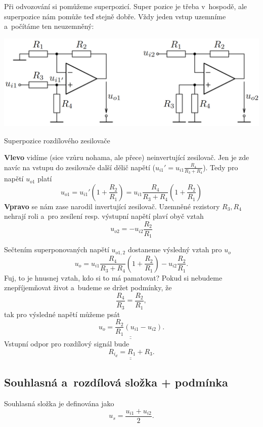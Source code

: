 \documentclass[a4paper,12pt]{article}   %
\begin{document}
Při odvozování si pomůžeme superpozicí. Super pozice je třeba v~hospodě, ale superpozice nám pomůže teď stejně dobře. Vždy jeden vstup uzemníme a~počítáme ten neuzemněný:
\begin{schema}[h!]
    \centering
    \includegraphics[height=.25\linewidth]{rozdilovy-zesilovac-oz-superpozice.PNG}
    \caption{Superpozice rozdílového zesilovače}
\end{schema}
\textbf{Vlevo} vidíme (sice vzůru nohama, ale přece) neinvertující zesilovač. Jen je zde navíc na vstupu do zesilovače další dělič napětí ($u_{i1}' = u_{i1}\frac{R_4}{R_3 + R_4}$). Tedy pro napětí $u_{o1}$ platí 
\begin{equation*}
    u_{o1} = u_{i1}'\left(1+\frac{R_2}{R_1}\right) = u_{i1}\frac{R_4}{R_3+R_4}\left(1+\frac{R_2}{R_1}\right)
\end{equation*}
\textbf{Vpravo} se nám zase narodil invertující zesilovač. Uzemněné rezistory $R_3, R_4$ nehrají roli a~pro zesílení resp. výstupní napětí plaví obyč vztah
\begin{equation*}
    u_{o2} = -u_{i2}\frac{R_2}{R_1}
\end{equation*}

Sečtením superponovaných napětí $u_{o1,2}$ dostaneme výsledný vztah pro $u_o$
\begin{equation}
    u_o = u_{i1}\frac{R_4}{R_3+R_4}\left(1+\frac{R_2}{R_1}\right)-u_{i2}\frac{R_2}{R_1}.
\end{equation}
Fuj, to je hnusnej vztah, kdo si to má pamatovat? Pokud si nebudeme znepříjemňovat život a~budeme se držet podmínky, že
\begin{equation*}
    \frac{R_4}{R_3} = \frac{R_2}{R_1},
\end{equation*}
tak pro výsledné napětí můžeme psát
\begin{equation}
    \underline{\underline{u_o = \frac{R_2}{R_1}(u_{i1}-u_{i2})}}.
\end{equation}
Vstupní odpor pro rozdílový signál bude
\begin{equation}
    \underline{\underline{R_{i_d} = R_1 + R_3}}.
\end{equation}


\subsection*{Souhlasná a~rozdílová složka + podmínka}
Souhlasná složka je definována jako
\begin{equation*}
    u_s = \frac{u_{i1} + u_{i2}}{2}.
\end{equation*}
\end{document}
